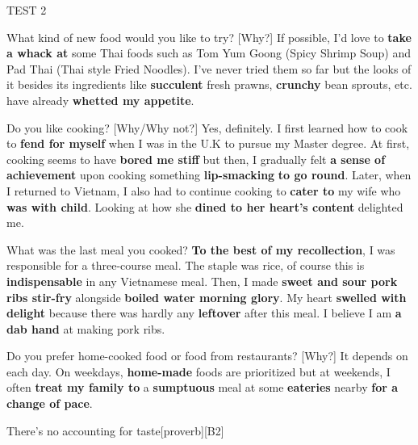 \begin{glossarymc}[Cambridge 4]
\begin{test}{TEST 2}
	\begin{qa}{What kind of new food would you like to try? [Why?]}
	If possible, I'd love to \textbf{take a whack at} some Thai foods such as Tom Yum Goong (Spicy Shrimp Soup) and Pad Thai (Thai style Fried Noodles). I've never tried them so far but the looks of it besides its ingredients like \textbf{succulent} fresh prawns, \textbf{crunchy} bean sprouts, etc. have already \textbf{whetted my appetite}.
	\end{qa}

	\begin{qa}{Do you like cooking? [Why/Why not?]}
	Yes, definitely. I first learned how to cook to \textbf{fend for myself} when I was in the U.K to pursue my Master degree. At first, cooking seems to have \textbf{bored me stiff} but then, I gradually felt \textbf{a sense of achievement} upon cooking something \textbf{lip-smacking} \textbf{to go round}. Later, when I returned to Vietnam, I also had to continue cooking to \textbf{cater to} my wife who \textbf{was with child}. Looking at how she \textbf{dined to her heart's content} delighted me.
	\end{qa}

	\begin{qa}{What was the last meal you cooked?}
	\textbf{To the best of my recollection}, I was responsible for a three-course meal. The staple was rice, of course this is \textbf{indispensable} in any Vietnamese meal. Then, I made \textbf{sweet and sour pork ribs stir-fry} alongside \textbf{boiled water morning glory}. My heart \textbf{swelled with delight} because there was hardly any \textbf{leftover} after this meal. I believe I am \textbf{a dab hand} at making pork ribs.
	\end{qa}

	\begin{qa}{Do you prefer home-cooked food or food from restaurants? [Why?]}
	It depends on each day. On weekdays, \textbf{home-made} foods are prioritized but at weekends, I often \textbf{treat my family to} a \textbf{sumptuous} meal at some \textbf{eateries} nearby \textbf{for a change of pace}.
	\end{qa}

        \begin{VocabExplain}[Part 1]
			\begin{ExplainCard}{There's no accounting for taste}[proverb][B2]
			\end{ExplainCard}


\end{VocabExplain}
\end{test}
\end{glossarymc}
